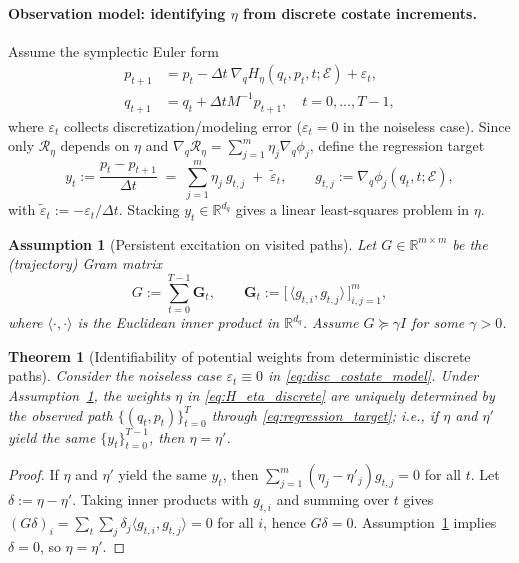 \documentclass{article} %
\newtheorem{theorem}{Theorem}[section]     %
\newtheorem{assumption}{Assumption}[section]
\begin{document}
\paragraph{Observation model: identifying $\eta$ from discrete costate increments.}
Assume the symplectic Euler form
\begin{equation}
\begin{aligned}
\label{eq:disc_costate_model}
p_{t+1}&=p_t-\Delta t~\nabla_q H_\eta(q_t,p_t,t;\mathcal E)+\varepsilon_t, \\
q_{t+1}&= q_t + \Delta t M^{-1} p_{t+1},\quad t=0,\dots,T-1, 
\end{aligned}
\end{equation}
where $\varepsilon_t$ collects discretization/modeling error ($\varepsilon_t=0$ in the noiseless case).
Since only $\mathcal R_\eta$ depends on $\eta$ and $\nabla_q \mathcal R_\eta=\sum_{j=1}^m \eta_j \nabla_q\phi_j$,
define the regression target
\begin{equation}
\label{eq:regression_target}
y_t
:=\frac{p_t-p_{t+1}}{\Delta t}\;=\;\sum_{j=1}^m \eta_j~g_{t,j}\;+\;\tilde\varepsilon_t,
\qquad
g_{t,j}:=\nabla_q\phi_j(q_t,t;\mathcal E),
\end{equation}
with $\tilde\varepsilon_t:=-\varepsilon_t/\Delta t$.
Stacking $y_t\in\mathbb R^{d_q}$ gives a linear least-squares problem in $\eta$.

\begin{assumption}[Persistent excitation on visited paths]
\label{ass:PE}
Let $G\in\mathbb R^{m\times m}$ be the (trajectory) Gram matrix
\[
G:=\sum_{t=0}^{T-1} \mathbf G_t,\qquad
\mathbf G_t:=\Big[\,\langle g_{t,i},g_{t,j}\rangle\,\Big]_{i,j=1}^m,
\]
where $\langle\cdot,\cdot\rangle$ is the Euclidean inner product in $\mathbb R^{d_q}$.
Assume $G\succeq \gamma I$ for some $\gamma>0$.
\end{assumption}

\begin{theorem}[Identifiability of potential weights from deterministic discrete paths]
\label{thm:identifiability_discrete}
Consider the noiseless case $\varepsilon_t\equiv 0$ in \cref{eq:disc_costate_model}.
Under Assumption~\ref{ass:PE}, the weights $\eta$ in \cref{eq:H_eta_discrete} are uniquely determined by the observed path
$\{(q_t,p_t)\}_{t=0}^{T}$ through \cref{eq:regression_target}; i.e., if $\eta$ and $\eta'$ yield the same
$\{y_t\}_{t=0}^{T-1}$, then $\eta=\eta'$.
\end{theorem}

\begin{proof}
If $\eta$ and $\eta'$ yield the same $y_t$, then $\sum_{j=1}^m(\eta_j-\eta'_j)g_{t,j}=0$ for all $t$.
Let $\delta:=\eta-\eta'$. Taking inner products with $g_{t,i}$ and summing over $t$ gives
$(G\delta)_i=\sum_{t}\sum_{j}\delta_j\langle g_{t,i},g_{t,j}\rangle=0$ for all $i$, hence $G\delta=0$.
Assumption~\ref{ass:PE} implies $\delta=0$, so $\eta=\eta'$.
\end{proof}
\end{document}
